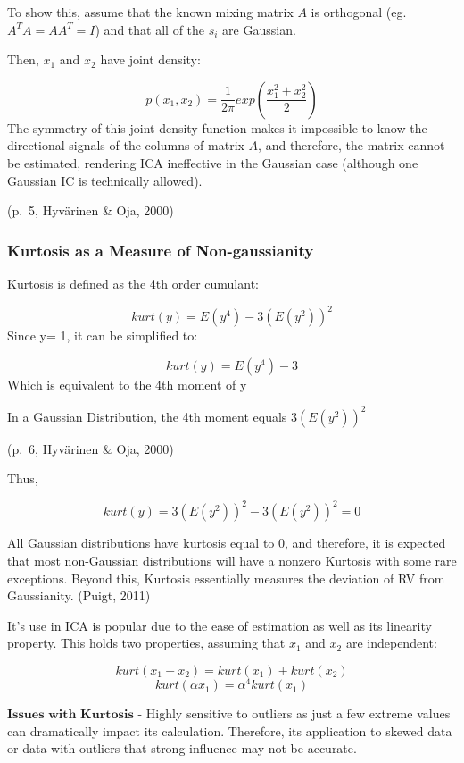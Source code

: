 \documentclass[12pt,twoside]{amherstthesis}
\begin{document}
  To show this, assume that the known mixing matrix \(A\) is orthogonal
  (eg. \(A^{T}A = AA^{T}= I\)) and that all of the \(s_i\) are Gaussian.
  
  Then, \(x_1\) and \(x_2\) have joint density:
  
  \[ p(x_1,x_2) = \frac{1}{2\pi}exp{(\frac{x_1^2+x_2^2}{2})}\] The
  symmetry of this joint density function makes it impossible to know the
  directional signals of the columns of matrix \(A\), and therefore, the
  matrix cannot be estimated, rendering ICA ineffective in the Gaussian
  case (although one Gaussian IC is technically allowed).
  
  (p.~5, Hyvärinen \& Oja, 2000)
  
  \subsubsection{Kurtosis as a Measure of
  Non-gaussianity}\label{kurtosis-as-a-measure-of-non-gaussianity}
  
  Kurtosis is defined as the 4th order cumulant:
  
  \[ kurt(y) = E(y^4) - 3(E(y^2))^2\] Since y= 1, it can be simplified to:
  
  \[ kurt(y) = E(y^4) - 3 \] Which is equivalent to the 4th moment of y
  \newline
  
  In a Gaussian Distribution, the 4th moment equals \(3(E(y^2))^2\)
  
  (p.~6, Hyvärinen \& Oja, 2000) \newline
  
  Thus,
  
  \[ kurt(y) = 3(E(y^2))^2 - 3(E(y^2))^2 = 0 \]
  
  All Gaussian distributions have kurtosis equal to 0, and therefore, it
  is expected that most non-Gaussian distributions will have a nonzero
  Kurtosis with some rare exceptions. Beyond this, Kurtosis essentially
  measures the deviation of RV from Gaussianity. (Puigt, 2011)
  
  It's use in ICA is popular due to the ease of estimation as well as its
  linearity property. This holds two properties, assuming that \(x_1\) and
  \(x_2\) are independent:
  
  \[ kurt(x_1 + x_2) = kurt(x_1) + kurt(x_2)\]
  \[ kurt(\alpha x_1) = \alpha^4 kurt(x_1)\]
  
  \(\textbf{Issues with Kurtosis}\) - Highly sensitive to outliers as just
  a few extreme values can dramatically impact its calculation. Therefore,
  its application to skewed data or data with outliers that strong
  influence may not be accurate.
  
\end{document}
